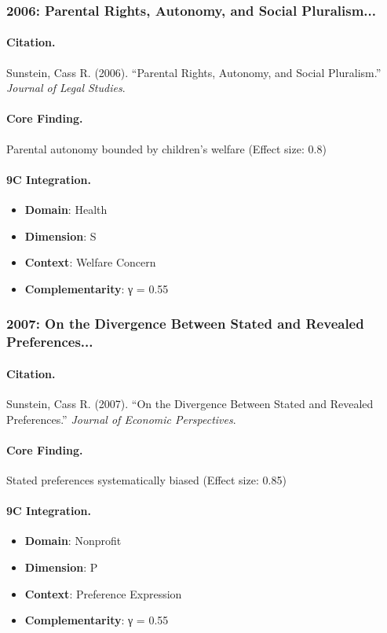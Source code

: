 \subsubsection{2006: Parental Rights, Autonomy, and Social Pluralism...}

\paragraph{Citation.}
Sunstein, Cass R. (2006). ``Parental Rights, Autonomy, and Social Pluralism.''
\textit{Journal of Legal Studies}.

\paragraph{Core Finding.}
Parental autonomy bounded by children's welfare (Effect size: 0.8)

\paragraph{9C Integration.}
\begin{itemize}[nosep]
  \item \textbf{Domain}: Health
  \item \textbf{Dimension}: S
  \item \textbf{Context}: Welfare Concern
  \item \textbf{Complementarity}: γ = 0.55
\end{itemize}

\subsubsection{2007: On the Divergence Between Stated and Revealed Preferences...}

\paragraph{Citation.}
Sunstein, Cass R. (2007). ``On the Divergence Between Stated and Revealed Preferences.''
\textit{Journal of Economic Perspectives}.

\paragraph{Core Finding.}
Stated preferences systematically biased (Effect size: 0.85)

\paragraph{9C Integration.}
\begin{itemize}[nosep]
  \item \textbf{Domain}: Nonprofit
  \item \textbf{Dimension}: P
  \item \textbf{Context}: Preference Expression
  \item \textbf{Complementarity}: γ = 0.55
\end{itemize}

